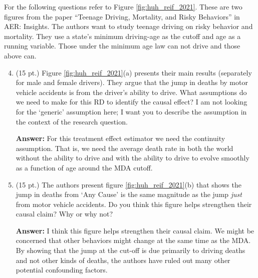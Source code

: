 \documentclass[12pt]{article}
\newcommand{\answer}[1]{{\color{blue_winged_teal}\textbf{Answer:} #1}}
\newcommand{\pts}[1]{{\color{zinc500}#1}}
\begin{document}
\bigskip
\noindent
For the following questions refer to Figure \ref{fig:huh_reif_2021}. 
These are two figures from the paper ``Teenage Driving, Mortality, and Risky Behaviors'' in AER: Insights. 
The authors want to study teenage driving on risky behavior and mortality. 
They use a state's minimum driving-age as the cutoff and age as a running variable. 
Those under the minimum age law can not drive and those above can. 

\medskip
\begin{enumerate}
  \setcounter{enumi}{3}
  \item \pts{(15 pt.)} Figure \ref{fig:huh_reif_2021}(a) presents their main results (separately for male and female drivers). 
  They argue that the jump in deaths by motor vehicle accidents is from the driver's ability to drive. 
  What assumptions do we need to make for this RD to identify the causal effect? 
  I am not looking for the `generic' assumption here; I want you to describe the assumption in the context of the research question.

  \answer{
    For this treatment effect estimator we need the continuity assumption.  That is, we need the average death rate in both the world without the ability to drive and with the ability to drive to evolve smoothly as a function of age around the MDA cutoff.
  }
 
  \medskip
  \item \pts{(15 pt.)} The authors present figure \ref{fig:huh_reif_2021}(b) that shows the jump in deaths from `Any Cause' is the same magnitude as the jump \emph{just} from motor vehicle accidents. 
  Do you think this figure helps strengthen their causal claim? Why or why not? 

  \answer{
    I think this figure helps strengthen their causal claim. We might be concerned that other behaviors might change at the same time as the MDA. 
    By showing that the jump at the cut-off is due primarily to driving deaths and not other kinds of deaths, the authors have ruled out many other potential confounding factors.
  }
\end{enumerate}
\end{document}
